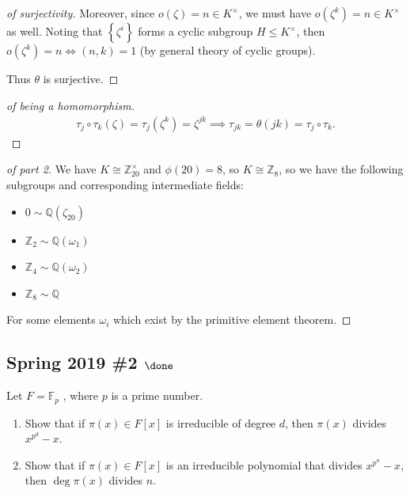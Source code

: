 \begin{solution}
\begin{proof}[of surjectivity]
Moreover, since \(o(\zeta) = n \in K^{\times}\), we must have
\(o(\zeta^k) = n \in K^{\times}\) as well. Noting that
\(\left\{{\zeta^i}\right\}\) forms a cyclic subgroup
\(H\leq K^{\times}\), then \(o(\zeta^k) = n \iff (n, k) = 1\) (by
general theory of cyclic groups).

Thus \(\theta\) is surjective.

\end{proof}

\begin{proof}[of being a homomorphism]

\begin{align*}
\tau_j \circ \tau_k (\zeta) =\tau_j(\zeta^k) = \zeta^{jk} \implies
\tau_{jk} = \theta(jk) = \tau_j \circ \tau_k
.\end{align*}

\end{proof}

\begin{proof}[of part 2]

We have \(K \cong {\mathbb{Z}}_{20}^{\times}\) and \(\phi(20) = 8\), so
\(K \cong {\mathbb{Z}}_8\), so we have the following subgroups and
corresponding intermediate fields:

\begin{itemize}
\tightlist
\item
  \(0 \sim {\mathbb{Q}}(\zeta_{20})\)
\item
  \({\mathbb{Z}}_2 \sim {\mathbb{Q}}(\omega_1)\)
\item
  \({\mathbb{Z}}_4 \sim {\mathbb{Q}}(\omega_2)\)
\item
  \({\mathbb{Z}}_8 \sim {\mathbb{Q}}\)
\end{itemize}

For some elements \(\omega_i\) which exist by the primitive element
theorem.

\end{proof}

\end{solution}

\hypertarget{spring-2019-2-done}{%
\subsection{\texorpdfstring{Spring 2019 \#2
\(\done\)}{Spring 2019 \#2 \textbackslash done}}\label{spring-2019-2-done}}

Let \(F = {\mathbb{F}}_p\) , where \(p\) is a prime number.

\begin{enumerate}
\def\labelenumi{\alph{enumi}.}
\item
  Show that if \(\pi(x) \in F[x]\) is irreducible of degree \(d\), then
  \(\pi(x)\) divides \(x^{p^d} - x\).
\item
  Show that if \(\pi(x) \in F[x]\) is an irreducible polynomial that
  divides \(x^{p^n} - x\), then \(\deg \pi(x)\) divides \(n\).
\end{enumerate}


